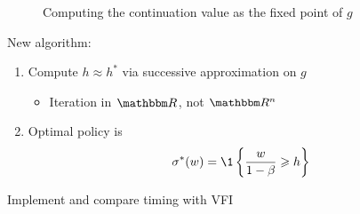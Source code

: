 \begin{frame}

    \begin{figure}
        \centering
        \caption{\label{f:iid_job_search_4} Computing the continuation value as the fixed point of $g$}
    \end{figure}

\end{frame}


\begin{frame}
    
    New algorithm:

    \begin{enumerate}
        \item Compute $h \approx h^*$ via successive approximation on $g$
            \vspace{1em}
            \begin{itemize}
                \item Iteration in $\RR$, not $\RR^n$
            \end{itemize}
            \vspace{1em}
        \item Optimal policy is 
            \begin{equation*}
                \sigma^*(w)
                = \1
                \left\{
                    \frac{w}{1-\beta}
                    \geq
                    h
                \right\}
            \end{equation*}
    \end{enumerate}


            \vspace{1em}
            \vspace{1em}
    \Ex Implement and compare timing with VFI

\end{frame}















